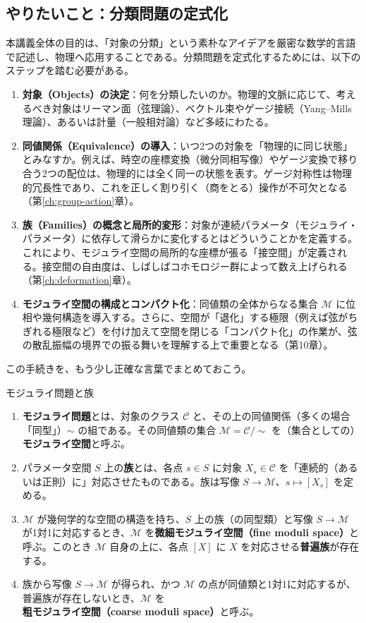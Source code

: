 \documentclass[uplatex, dvipdfmx, book]{jsbook}
\let\origsubsection\subsection
\let\origsubsubsection\subsubsection
\renewcommand{\section}{\origsubsection}
\renewcommand{\subsection}{\origsubsubsection}
\renewcommand{\subsubsection}{\paragraph}
\begin{document}
\section{やりたいこと：分類問題の定式化}

本講義全体の目的は、「対象の分類」という素朴なアイデアを厳密な数学的言語で記述し、物理へ応用することである。分類問題を定式化するためには、以下のステップを踏む必要がある。

\begin{enumerate}
    \item \textbf{対象（Objects）の決定}：何を分類したいのか。物理的文脈に応じて、考えるべき対象はリーマン面（弦理論）、ベクトル束やゲージ接続（Yang--Mills理論）、あるいは計量（一般相対論）など多岐にわたる。
    \item \textbf{同値関係（Equivalence）の導入}：いつ2つの対象を「物理的に同じ状態」とみなすか。例えば、時空の座標変換（微分同相写像）やゲージ変換で移り合う2つの配位は、物理的には全く同一の状態を表す。ゲージ対称性は物理的冗長性であり、これを正しく割り引く（商をとる）操作が不可欠となる（第\ref{ch:group-action}章）。
    \item \textbf{族（Families）の概念と局所的変形}：対象が連続パラメータ（モジュライ・パラメータ）に依存して滑らかに変化するとはどういうことかを定義する。これにより、モジュライ空間の局所的な座標が張る「接空間」が定義される。接空間の自由度は、しばしばコホモロジー群によって数え上げられる（第\ref{ch:deformation}章）。
    \item \textbf{モジュライ空間の構成とコンパクト化}：同値類の全体からなる集合 $\mathcal{M}$ に位相や幾何構造を導入する。さらに、空間が「退化」する極限（例えば弦がちぎれる極限など）を付け加えて空間を閉じる「コンパクト化」の作業が、弦の散乱振幅の境界での振る舞いを理解する上で重要となる（第10章）。
\end{enumerate}

この手続きを、もう少し正確な言葉でまとめておこう。

\begin{mydef}{モジュライ問題と族}{}
\begin{enumerate}
    \item \textbf{モジュライ問題}とは、対象のクラス $\mathcal{C}$ と、その上の同値関係（多くの場合「同型」）$\sim$ の組である。その同値類の集合 $\mathcal{M} = \mathcal{C}/\!\sim$ を（集合としての）\textbf{モジュライ空間}と呼ぶ。
    \item パラメータ空間 $S$ 上の\textbf{族}とは、各点 $s \in S$ に対象 $X_s \in \mathcal{C}$ を「連続的（あるいは正則）に」対応させたものである。族は写像 $S \to \mathcal{M}$、$s \mapsto [X_s]$ を定める。
    \item $\mathcal{M}$ が幾何学的な空間の構造を持ち、$S$ 上の族（の同型類）と写像 $S \to \mathcal{M}$ が1対1に対応するとき、$\mathcal{M}$ を\textbf{微細モジュライ空間（fine moduli space）}と呼ぶ。このとき $\mathcal{M}$ 自身の上に、各点 $[X]$ に $X$ を対応させる\textbf{普遍族}が存在する。
    \item 族から写像 $S \to \mathcal{M}$ が得られ、かつ $\mathcal{M}$ の点が同値類と1対1に対応するが、普遍族が存在しないとき、$\mathcal{M}$ を\textbf{粗モジュライ空間（coarse moduli space）}と呼ぶ。
\end{enumerate}
\end{mydef}
\end{document}
